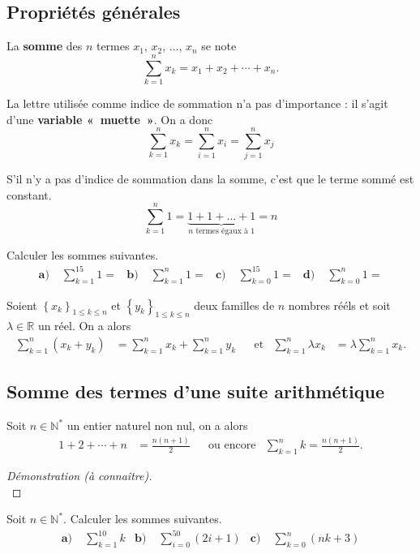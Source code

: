 \documentclass[11pt]{article}
\begin{document}
\subsection{Propriétés générales}
\begin{notation}
  La \textbf{somme} des $n$ termes $x_1$, $x_2$, $\dots$, $x_n$ se note
  \[
    \sum_{k=1}^n x_k = x_1 + x_2 + \cdots + x_n.
  \]
\end{notation}
\begin{rmq}
  La lettre utilisée comme indice de sommation n'a pas d'importance : il s'agit
  d'une \textbf{variable «~muette~»}. On a donc
  \[
    \sum_{k=1}^n x_k =
    \sum_{i=1}^n x_i =
    \sum_{j=1}^n x_j
  \]
\end{rmq}
\begin{prop}
S'il n'y a pas d'indice de sommation dans la somme, c'est que le terme sommé
est constant.
  \[
    \sum_{k=1}^{n} 1 = \underbrace{1+1+\dots+1}_{n\text{ termes égaux à }1} = n
  \]
\end{prop}
\begin{app}
  Calculer les sommes suivantes.
  \begin{align*}
    \textbf{a)}\; & \sum_{k=1}^{15} 1 = &
    \textbf{b)}\; & \sum_{k=1}^{n} 1 = &
    \textbf{c)}\; & \sum_{k=0}^{15} 1 = &
    \textbf{d)}\; & \sum_{k=0}^{n} 1 =
  \end{align*}
\end{app}
\begin{prop}
  Soient $\left\{ x_k \right\}_{1\leq k \leq n}$ et $\left\{ y_k \right\}_{1\leq
  k \leq n}$ deux familles de $n$ nombres rééls et soit $\lambda\in\mathbb{R}$
  un réel. On a alors
  \begin{align*}
    \sum_{k=1}^n\left( x_k+y_k \right) &= \sum_{k=1}^nx_k+\sum_{k=1}^ny_k &
    &\text{et}&
    \sum_{k=1}^n\lambda x_k &= \lambda\sum_{k=1}^nx_k.
  \end{align*}
\end{prop}
\subsection{Somme des termes d'une suite arithmétique}
\begin{thm}
  Soit $n\in\mathbb{N}^*$ un entier naturel non nul, on a alors
  \begin{align*}
    1+2+\cdots+n &= \frac{n(n+1)}{2} &
    &\text{ou encore} &
    \sum_{k=1}^n k = \frac{n(n+1)}{2}.
  \end{align*}
\end{thm}
\begin{proof}[Démonstration (à connaître)]
  ~\vspace{4cm}\\
\end{proof}
\begin{app}
  Soit $n\in\mathbb{N}^*$. Calculer les sommes suivantes.
  \begin{align*}
    \textbf{a)}\;& \sum_{k=1}^{10} k &
    \textbf{b)}\;& \sum_{i=0}^{50} \left( 2i+1 \right) &
    \textbf{c)}\;& \sum_{k=0}^{n} (nk+3)
  \end{align*}
\end{app}
\end{document}
